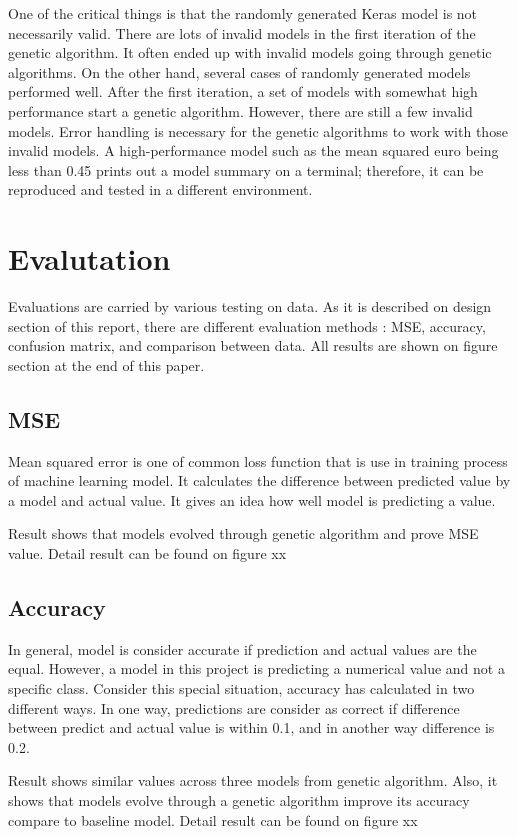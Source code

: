\documentclass[11pt, natbib=false]{article}
\begin{document}
One of the critical things is that the randomly generated Keras model is not necessarily valid.
There are lots of invalid models in the first iteration of the genetic algorithm.
It often ended up with invalid models going through genetic algorithms. On the other hand, several cases of randomly generated models performed well.
After the first iteration, a set of models with somewhat high performance start a genetic algorithm.
However, there are still a few invalid models.
Error handling is necessary for the genetic algorithms to work with those invalid models.
A high-performance model such as the mean squared euro being less than 0.45 prints out a model summary on a terminal; therefore, it can be reproduced and tested in a different environment.


\section{Evalutation}
Evaluations are carried by various testing on data. As it is described on design section of this report, there are different evaluation methods : MSE, accuracy, confusion matrix, and comparison between data. All results are shown on figure section at the end of this paper.

\subsection{MSE}
Mean squared error is one of common loss function that is use in training process of machine learning model. It calculates the difference between predicted value by a model and actual value. It gives an idea how well model is predicting a value.

Result shows that models evolved through genetic algorithm and prove MSE value.
Detail result can be found on figure xx

\subsection{Accuracy}
In general, model is consider accurate if prediction and actual values are the equal. However, a model in this project is predicting a numerical value and not a specific class. Consider this special situation, accuracy has calculated in two different ways. In one way, predictions are consider as correct if difference between predict and actual value is within 0.1, and in another way difference is 0.2.

Result shows similar values across three models from genetic algorithm. Also, it shows that models evolve through a genetic algorithm improve its accuracy compare to baseline model.
Detail result can be found on figure xx
\end{document}
